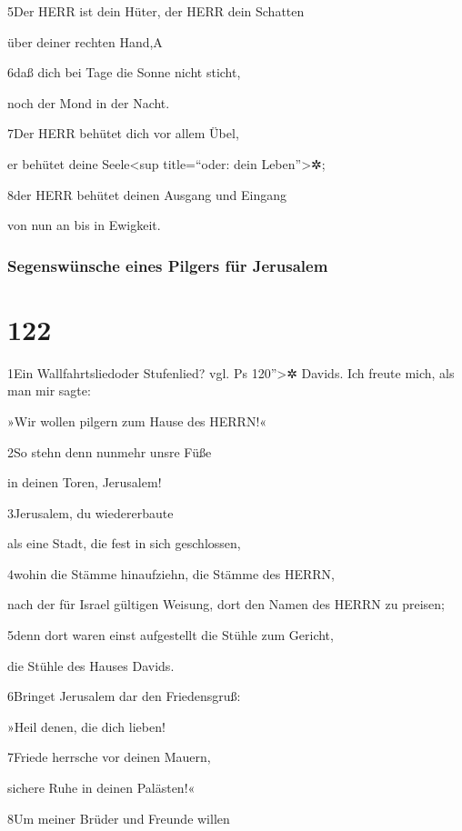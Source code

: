 5Der HERR ist dein Hüter, der HERR dein Schatten

über deiner rechten Hand,{A}

6daß dich bei Tage die Sonne nicht sticht,

noch der Mond in der Nacht.

7Der HERR behütet dich vor allem Übel,

er behütet deine Seele\textless sup title=``oder: dein
Leben''\textgreater✲;

8der HERR behütet deinen Ausgang und Eingang

von nun an bis in Ewigkeit.

\hypertarget{segenswuxfcnsche-eines-pilgers-fuxfcr-jerusalem}{%
\subsubsection{Segenswünsche eines Pilgers für
Jerusalem}\label{segenswuxfcnsche-eines-pilgers-fuxfcr-jerusalem}}

\hypertarget{section-121}{%
\section{122}\label{section-121}}

1Ein Wallfahrtsliedoder Stufenlied? vgl. Ps 120''\textgreater✲ Davids.
Ich freute mich, als man mir sagte:

»Wir wollen pilgern zum Hause des HERRN!«

2So stehn denn nunmehr unsre Füße

in deinen Toren, Jerusalem!

3Jerusalem, du wiedererbaute

als eine Stadt, die fest in sich geschlossen,

4wohin die Stämme hinaufziehn, die Stämme des HERRN,

nach der für Israel gültigen Weisung, dort den Namen des HERRN zu
preisen;

5denn dort waren einst aufgestellt die Stühle zum Gericht,

die Stühle des Hauses Davids.

6Bringet Jerusalem dar den Friedensgruß:

»Heil denen, die dich lieben!

7Friede herrsche vor deinen Mauern,

sichere Ruhe in deinen Palästen!«

8Um meiner Brüder und Freunde willen

